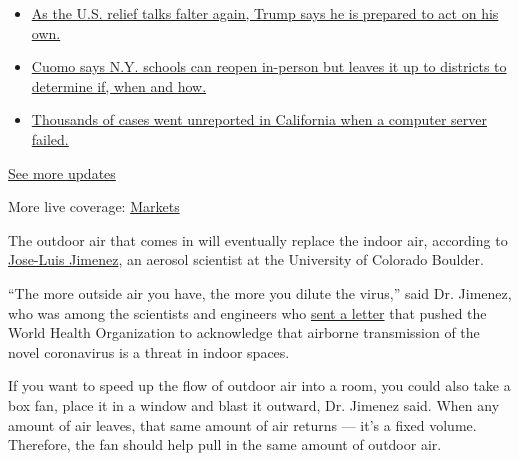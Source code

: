 \begin{itemize}
\tightlist
\item
  \href{https://www.nytimes.com/2020/08/07/world/covid-19-news.html?action=click\&pgtype=Article\&state=default\&region=MAIN_CONTENT_1\&context=storylines_live_updates\#link-1f86d03a}{As
  the U.S. relief talks falter again, Trump says he is prepared to act
  on his own.}
\item
  \href{https://www.nytimes.com/2020/08/07/world/covid-19-news.html?action=click\&pgtype=Article\&state=default\&region=MAIN_CONTENT_1\&context=storylines_live_updates\#link-3f64a70a}{Cuomo
  says N.Y. schools can reopen in-person but leaves it up to districts
  to determine if, when and how.}
\item
  \href{https://www.nytimes.com/2020/08/07/world/covid-19-news.html?action=click\&pgtype=Article\&state=default\&region=MAIN_CONTENT_1\&context=storylines_live_updates\#link-14e70066}{Thousands
  of cases went unreported in California when a computer server failed.}
\end{itemize}

\href{https://www.nytimes.com/2020/08/07/world/covid-19-news.html?action=click\&pgtype=Article\&state=default\&region=MAIN_CONTENT_1\&context=storylines_live_updates}{See
more updates}

More live coverage:
\href{https://www.nytimes.com/live/2020/08/07/business/stock-market-today-coronavirus?action=click\&pgtype=Article\&state=default\&region=MAIN_CONTENT_1\&context=storylines_live_updates}{Markets}

The outdoor air that comes in will eventually replace the indoor air,
according to
\href{https://www.colorado.edu/chemistry/jose-luis-jimenez}{Jose-Luis
Jimenez}, an aerosol scientist at the University of Colorado Boulder.

``The more outside air you have, the more you dilute the virus,'' said
Dr. Jimenez, who was among the scientists and engineers who
\href{https://www.nytimes.com/2020/07/07/health/coronavirus-aerosols-who.html}{sent
a letter} that pushed the World Health Organization to acknowledge that
airborne transmission of the novel coronavirus is a threat in indoor
spaces.

If you want to speed up the flow of outdoor air into a room, you could
also take a box fan, place it in a window and blast it outward, Dr.
Jimenez said. When any amount of air leaves, that same amount of air
returns --- it's a fixed volume. Therefore, the fan should help pull in
the same amount of outdoor air.

